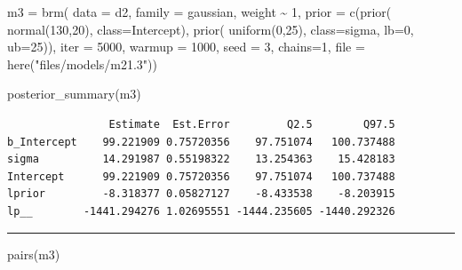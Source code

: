 \documentclass[
  letterpaper,
  DIV=11,
  numbers=noendperiod]{scrartcl}
\newenvironment{Shaded}{\begin{snugshade}}{\end{snugshade}}
\newcommand{\AttributeTok}[1]{\textcolor[rgb]{0.40,0.45,0.13}{#1}}
\newcommand{\DecValTok}[1]{\textcolor[rgb]{0.68,0.00,0.00}{#1}}
\newcommand{\FunctionTok}[1]{\textcolor[rgb]{0.28,0.35,0.67}{#1}}
\newcommand{\NormalTok}[1]{\textcolor[rgb]{0.00,0.23,0.31}{#1}}
\newcommand{\OtherTok}[1]{\textcolor[rgb]{0.00,0.23,0.31}{#1}}
\newcommand{\SpecialCharTok}[1]{\textcolor[rgb]{0.37,0.37,0.37}{#1}}
\newcommand{\StringTok}[1]{\textcolor[rgb]{0.13,0.47,0.30}{#1}}
\begin{document}
\begin{Shaded}
\begin{Highlighting}[]
\NormalTok{m3 }\OtherTok{=} \FunctionTok{brm}\NormalTok{(}
  \AttributeTok{data =}\NormalTok{ d2,}
  \AttributeTok{family =}\NormalTok{ gaussian,}
\NormalTok{  weight }\SpecialCharTok{\textasciitilde{}} \DecValTok{1}\NormalTok{,}
  \AttributeTok{prior =} \FunctionTok{c}\NormalTok{(}\FunctionTok{prior}\NormalTok{( }\FunctionTok{normal}\NormalTok{(}\DecValTok{130}\NormalTok{,}\DecValTok{20}\NormalTok{), }\AttributeTok{class=}\NormalTok{Intercept),}
            \FunctionTok{prior}\NormalTok{( }\FunctionTok{uniform}\NormalTok{(}\DecValTok{0}\NormalTok{,}\DecValTok{25}\NormalTok{), }\AttributeTok{class=}\NormalTok{sigma, }\AttributeTok{lb=}\DecValTok{0}\NormalTok{, }\AttributeTok{ub=}\DecValTok{25}\NormalTok{)),  }
      \AttributeTok{iter =} \DecValTok{5000}\NormalTok{, }\AttributeTok{warmup =} \DecValTok{1000}\NormalTok{, }\AttributeTok{seed =} \DecValTok{3}\NormalTok{, }\AttributeTok{chains=}\DecValTok{1}\NormalTok{,}
  \AttributeTok{file =} \FunctionTok{here}\NormalTok{(}\StringTok{"files/models/m21.3"}\NormalTok{))}
\end{Highlighting}
\end{Shaded}

\begin{Shaded}
\begin{Highlighting}[]
\FunctionTok{posterior\_summary}\NormalTok{(m3)}
\end{Highlighting}
\end{Shaded}

\begin{verbatim}
                Estimate  Est.Error         Q2.5        Q97.5
b_Intercept    99.221909 0.75720356    97.751074   100.737488
sigma          14.291987 0.55198322    13.254363    15.428183
Intercept      99.221909 0.75720356    97.751074   100.737488
lprior         -8.318377 0.05827127    -8.433538    -8.203915
lp__        -1441.294276 1.02695551 -1444.235605 -1440.292326
\end{verbatim}

\begin{center}\rule{0.5\linewidth}{0.5pt}\end{center}

\begin{Shaded}
\begin{Highlighting}[]
\FunctionTok{pairs}\NormalTok{(m3)}
\end{Highlighting}
\end{Shaded}
\end{document}
